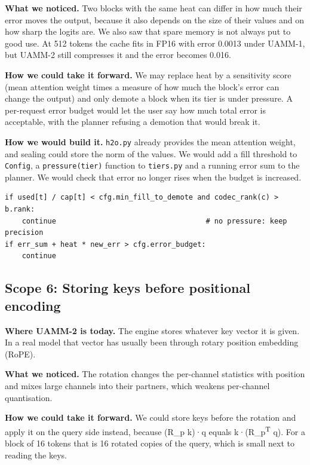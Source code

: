 \documentclass[12pt,a4paper]{report}
\begin{document}
\textbf{What we noticed.} Two blocks with the same heat can differ in how much their error moves the output, because it also depends on the size of their values and on how sharp the logits are. We also saw that spare memory is not always put to good use. At 512 tokens the cache fits in FP16 with error 0.0013 under UAMM-1, but UAMM-2 still compresses it and the error becomes 0.016.

\textbf{How we could take it forward.} We may replace heat by a sensitivity score (mean attention weight times a measure of how much the block's error can change the output) and only demote a block when its tier is under pressure. A per-request error budget would let the user say how much total error is acceptable, with the planner refusing a demotion that would break it.

\textbf{How we would build it.} \texttt{h2o.\allowbreak{}py} already provides the mean attention weight, and sealing could store the norm of the values. We would add a fill threshold to \texttt{Config}, a \texttt{pressure(tier)} function to \texttt{tiers.\allowbreak{}py} and a running error sum to the planner. We would check that error no longer rises when the budget is increased.

\begin{lstlisting}
if used[t] / cap[t] < cfg.min_fill_to_demote and codec_rank(c) > b.rank:
    continue                                   # no pressure: keep precision
if err_sum + heat * new_err > cfg.error_budget:
    continue
\end{lstlisting}
\subsection{Scope 6: Storing keys before positional encoding}
\textbf{Where UAMM-2 is today.} The engine stores whatever key vector it is given. In a real model that vector has usually been through rotary position embedding (RoPE).

\textbf{What we noticed.} The rotation changes the per-channel statistics with position and mixes large channels into their partners, which weakens per-channel quantisation.

\textbf{How we could take it forward.} We could store keys before the rotation and apply it on the query side instead, because (R\_\allowbreak{}p k)·q equals k·(R\_\allowbreak{}p\textsuperscript{T} q). For a block of 16 tokens that is 16 rotated copies of the query, which is small next to reading the keys.
\end{document}
